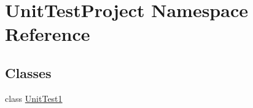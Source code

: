 \hypertarget{namespace_unit_test_project}{}\section{Unit\+Test\+Project Namespace Reference}
\label{namespace_unit_test_project}
\subsection*{Classes}
\begin{DoxyCompactItemize}
\item 
class \mbox{\hyperlink{class_unit_test_project_1_1_unit_test1}{Unit\+Test1}}
\end{DoxyCompactItemize}
